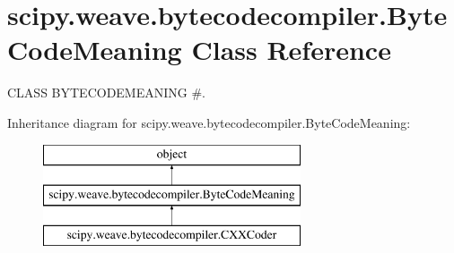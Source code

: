 \hypertarget{classscipy_1_1weave_1_1bytecodecompiler_1_1ByteCodeMeaning}{}\section{scipy.\+weave.\+bytecodecompiler.\+Byte\+Code\+Meaning Class Reference}
\label{classscipy_1_1weave_1_1bytecodecompiler_1_1ByteCodeMeaning}


C\+L\+A\+S\+S B\+Y\+T\+E\+C\+O\+D\+E\+M\+E\+A\+N\+I\+N\+G \#.  


Inheritance diagram for scipy.\+weave.\+bytecodecompiler.\+Byte\+Code\+Meaning\+:\begin{figure}[H]
\begin{center}
\leavevmode
\includegraphics[height=3.000000cm]{classscipy_1_1weave_1_1bytecodecompiler_1_1ByteCodeMeaning}
\end{center}
\end{figure}
